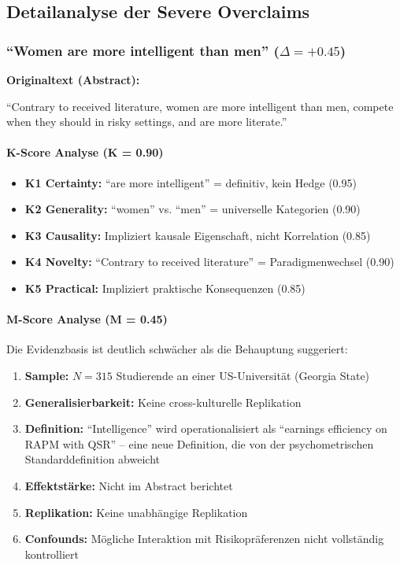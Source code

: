 \subsection{Detailanalyse der Severe Overclaims}

\subsubsection{``Women are more intelligent than men'' ($\Delta = +0.45$)}

\begin{tcolorbox}[colback=red!5!white,colframe=red!50!black,title=Severe Overclaim]
\textbf{Originaltext (Abstract):}

``Contrary to received literature, women are more intelligent than men, compete when they should in risky settings, and are more literate.''
\end{tcolorbox}

\paragraph{K-Score Analyse (K = 0.90)}
\begin{itemize}
    \item \textbf{K1 Certainty:} ``are more intelligent'' = definitiv, kein Hedge (0.95)
    \item \textbf{K2 Generality:} ``women'' vs. ``men'' = universelle Kategorien (0.90)
    \item \textbf{K3 Causality:} Impliziert kausale Eigenschaft, nicht Korrelation (0.85)
    \item \textbf{K4 Novelty:} ``Contrary to received literature'' = Paradigmenwechsel (0.90)
    \item \textbf{K5 Practical:} Impliziert praktische Konsequenzen (0.85)
\end{itemize}

\paragraph{M-Score Analyse (M = 0.45)}

Die Evidenzbasis ist deutlich schw\"acher als die Behauptung suggeriert:
\begin{enumerate}
    \item \textbf{Sample:} $N = 315$ Studierende an einer US-Universit\"at (Georgia State)
    \item \textbf{Generalisierbarkeit:} Keine cross-kulturelle Replikation
    \item \textbf{Definition:} ``Intelligence'' wird operationalisiert als ``earnings efficiency on RAPM with QSR'' -- eine neue Definition, die von der psychometrischen Standarddefinition abweicht
    \item \textbf{Effektst\"arke:} Nicht im Abstract berichtet
    \item \textbf{Replikation:} Keine unabh\"angige Replikation
    \item \textbf{Confounds:} M\"ogliche Interaktion mit Risikopr\"aferenzen nicht vollst\"andig kontrolliert
\end{enumerate}

